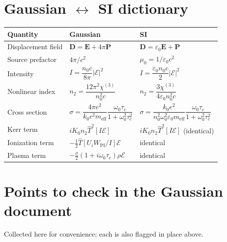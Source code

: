 \documentclass[11pt,a4paper]{article}
\begin{document}
\appendix
\section{Gaussian \texorpdfstring{$\leftrightarrow$}{<->} SI dictionary}

\begin{center}
\begin{tabular}{lll}
\toprule
Quantity & Gaussian & SI \\
\midrule
Displacement field & $\mathbf{D}=\mathbf{E}+4\pi\mathbf{P}$
                   & $\mathbf{D}=\varepsilon_0\mathbf{E}+\mathbf{P}$ \\
Source prefactor   & $4\pi/c^2$ & $\mu_0 = 1/\varepsilon_0c^2$ \\
Intensity          & $I=\dfrac{n_0c}{8\pi}|\mathcal{E}|^2$
                   & $I=\dfrac{\varepsilon_0 n_0 c}{2}|\mathcal{E}|^2$ \\[0.6em]
Nonlinear index    & $n_2=\dfrac{12\pi^2\chi^{(3)}}{n_0^2c}$
                   & $n_2=\dfrac{3\chi^{(3)}}{4\varepsilon_0n_0^2c}$ \\[0.6em]
Cross section      & $\sigma=\dfrac{4\pi e^2}{k_0c^2m_{\text{eff}}}
                              \dfrac{\omega_0\tau_c}{1+\omega_0^2\tau_c^2}$
                   & $\sigma=\dfrac{k_0e^2}{n_0^2\omega_0^2\varepsilon_0m_{\text{eff}}}
                              \dfrac{\omega_0\tau_c}{1+\omega_0^2\tau_c^2}$ \\[0.6em]
Kerr term          & $iK_0n_2\hat T^2[I\mathcal{E}]$
                   & $iK_0n_2\hat T^2[I\mathcal{E}]$ \quad(identical) \\
Ionization term    & $-\tfrac12\hat T[U_iW_{\text{PI}}/I]\mathcal{E}$
                   & identical \\
Plasma term        & $-\tfrac{\sigma}{2}(1+i\omega_0\tau_c)\rho\mathcal{E}$
                   & identical \\
\bottomrule
\end{tabular}
\end{center}

\section{Points to check in the Gaussian document}

Collected here for convenience; each is also flagged in place above.
\end{document}
